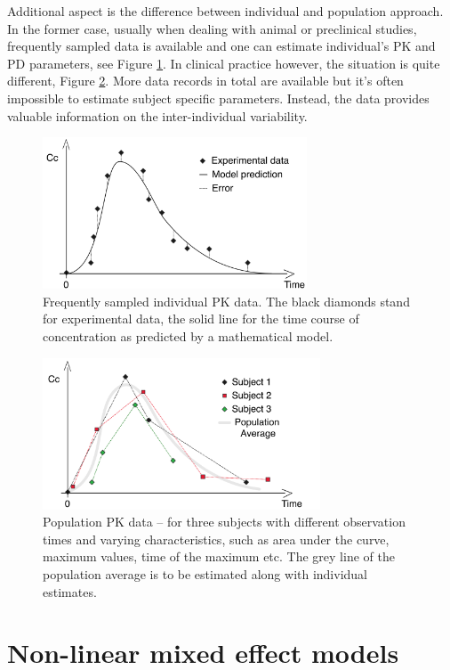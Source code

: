 Additional aspect is the difference between individual and population approach. 
In the former case, usually when dealing with animal or preclinical studies, 
frequently sampled data is available and one can estimate individual's PK and 
PD parameters, see Figure \ref{fig:indivModel}. In clinical practice however, 
the situation is quite different, Figure \ref{fig:popModel}. More data records 
in total are available but it's often impossible to estimate subject specific 
parameters. Instead, the data provides valuable information on the inter-individual 
variability. 
\begin{figure}[htbp]
\centering
 \includegraphics[height=45mm]{pics/Model-individual}
\caption{Frequently sampled individual PK data. The black diamonds stand 
for experimental data, the solid line for the time course of concentration as 
predicted by a mathematical model. }
\label{fig:indivModel}
\end{figure}

\begin{figure}[htbp]
\centering
 \includegraphics[height=45mm]{pics/Model-population}
\caption{Population PK data --  for three subjects with different observation times 
and varying characteristics, such as area under the curve, maximum values, 
time of the maximum etc. The grey line of the population average is to be 
estimated along with individual estimates.}
\label{fig:popModel}
\end{figure}

\section{Non-linear mixed effect models}

